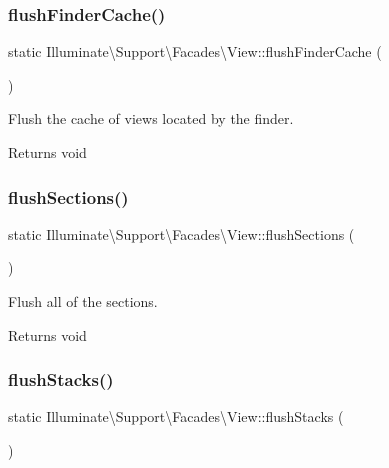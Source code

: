 \subsubsection{\texorpdfstring{flush\+Finder\+Cache()}{flushFinderCache()}}
{\footnotesize\ttfamily static Illuminate\textbackslash{}\+Support\textbackslash{}\+Facades\textbackslash{}\+View\+::flush\+Finder\+Cache (\begin{DoxyParamCaption}{ }\end{DoxyParamCaption})\hspace{0.3cm}{\ttfamily [static]}}

Flush the cache of views located by the finder.

\begin{DoxyReturn}{Returns}
void 
\end{DoxyReturn}
\mbox{\label{class_illuminate_1_1_support_1_1_facades_1_1_view_a4b965a27a3ec004cba4c196d3dca9154}} 
\subsubsection{\texorpdfstring{flush\+Sections()}{flushSections()}}
{\footnotesize\ttfamily static Illuminate\textbackslash{}\+Support\textbackslash{}\+Facades\textbackslash{}\+View\+::flush\+Sections (\begin{DoxyParamCaption}{ }\end{DoxyParamCaption})\hspace{0.3cm}{\ttfamily [static]}}

Flush all of the sections.

\begin{DoxyReturn}{Returns}
void 
\end{DoxyReturn}
\mbox{\label{class_illuminate_1_1_support_1_1_facades_1_1_view_a0dcb31addf81925d1863ca46cc867fac}} 
\subsubsection{\texorpdfstring{flush\+Stacks()}{flushStacks()}}
{\footnotesize\ttfamily static Illuminate\textbackslash{}\+Support\textbackslash{}\+Facades\textbackslash{}\+View\+::flush\+Stacks (\begin{DoxyParamCaption}{ }\end{DoxyParamCaption})\hspace{0.3cm}{\ttfamily [static]}}

